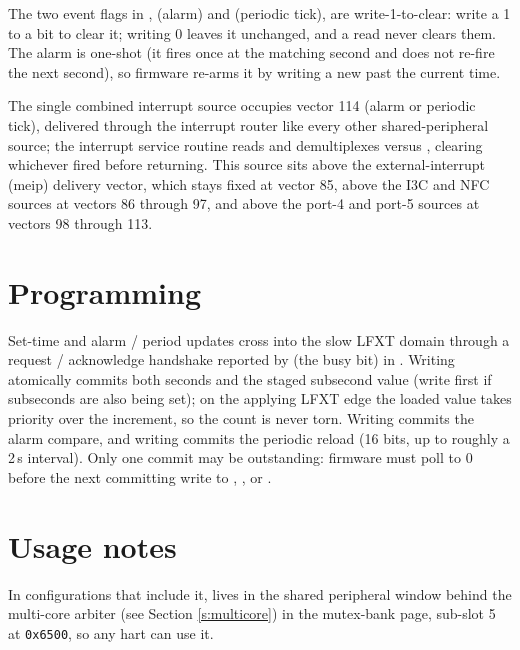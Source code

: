 The two event flags in ,  (alarm) and  (periodic tick), are write-1-to-clear: write a 1 to a bit to clear it; writing 0 leaves it unchanged, and a read never clears them. The alarm is one-shot (it fires once at the matching second and does not re-fire the next second), so firmware re-arms it by writing a new  past the current time.

The single combined interrupt source occupies vector 114 (alarm or periodic tick), delivered through the interrupt router like every other shared-peripheral source; the interrupt service routine reads  and demultiplexes  versus , clearing whichever fired before returning. This source sits above the external-interrupt (meip) delivery vector, which stays fixed at vector 85, above the I3C and NFC sources at vectors 86 through 97, and above the  port-4 and port-5 sources at vectors 98 through 113.

\section{Programming}

Set-time and alarm / period updates cross into the slow LFXT domain through a request / acknowledge handshake reported by  (the busy bit) in . Writing  atomically commits both seconds and the staged subsecond value (write  first if subseconds are also being set); on the applying LFXT edge the loaded value takes priority over the increment, so the count is never torn. Writing  commits the alarm compare, and writing  commits the periodic reload (16 bits, up to roughly a 2\,s interval). Only one commit may be outstanding: firmware must poll  to 0 before the next committing write to , , or .

\section{Usage notes}

In configurations that include it,  lives in the shared peripheral window behind the multi-core arbiter (see Section \ref{s:multicore}) in the mutex-bank page, sub-slot 5 at \texttt{0x6500}, so any hart can use it.
